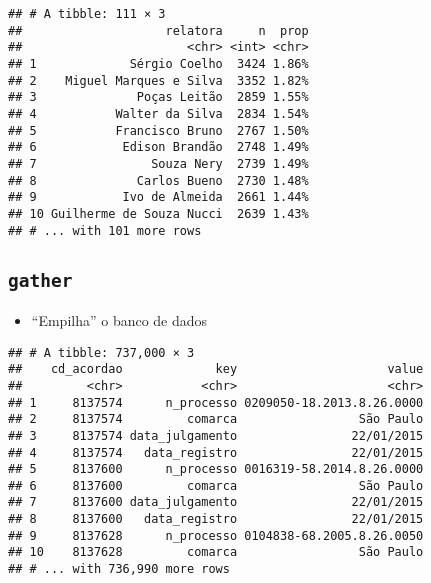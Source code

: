 \documentclass[]{book}
\newenvironment{Shaded}{\begin{snugshade}}{\end{snugshade}}
\newcommand{\KeywordTok}[1]{\textcolor[rgb]{0.13,0.29,0.53}{\textbf{{#1}}}}
\newcommand{\DataTypeTok}[1]{\textcolor[rgb]{0.13,0.29,0.53}{{#1}}}
\newcommand{\StringTok}[1]{\textcolor[rgb]{0.31,0.60,0.02}{{#1}}}
\newcommand{\OtherTok}[1]{\textcolor[rgb]{0.56,0.35,0.01}{{#1}}}
\newcommand{\NormalTok}[1]{{#1}}
\providecommand{\tightlist}{%
  \setlength{\itemsep}{0pt}\setlength{\parskip}{0pt}}
\begin{document}
\begin{Shaded}
\end{Shaded}

\begin{verbatim}
## # A tibble: 111 × 3
##                    relatora     n  prop
##                       <chr> <int> <chr>
## 1             Sérgio Coelho  3424 1.86%
## 2    Miguel Marques e Silva  3352 1.82%
## 3              Poças Leitão  2859 1.55%
## 4           Walter da Silva  2834 1.54%
## 5           Francisco Bruno  2767 1.50%
## 6            Edison Brandão  2748 1.49%
## 7                Souza Nery  2739 1.49%
## 8              Carlos Bueno  2730 1.48%
## 9            Ivo de Almeida  2661 1.44%
## 10 Guilherme de Souza Nucci  2639 1.43%
## # ... with 101 more rows
\end{verbatim}

\subsection{\texorpdfstring{\texttt{gather}}{gather}}\label{gather}

\begin{itemize}
\tightlist
\item
  ``Empilha'' o banco de dados
\end{itemize}

\begin{Shaded}
\end{Shaded}

\begin{verbatim}
## # A tibble: 737,000 × 3
##    cd_acordao             key                     value
##         <chr>           <chr>                     <chr>
## 1     8137574      n_processo 0209050-18.2013.8.26.0000
## 2     8137574         comarca                 São Paulo
## 3     8137574 data_julgamento                22/01/2015
## 4     8137574   data_registro                22/01/2015
## 5     8137600      n_processo 0016319-58.2014.8.26.0000
## 6     8137600         comarca                 São Paulo
## 7     8137600 data_julgamento                22/01/2015
## 8     8137600   data_registro                22/01/2015
## 9     8137628      n_processo 0104838-68.2005.8.26.0050
## 10    8137628         comarca                 São Paulo
## # ... with 736,990 more rows
\end{verbatim}
\end{document}
